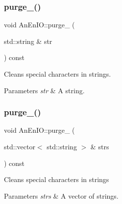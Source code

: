 \subsubsection{\texorpdfstring{purge\+\_\+()}{purge\_()}\hspace{0.1cm}{\footnotesize\ttfamily [1/2]}}
{\footnotesize\ttfamily void An\+En\+I\+O\+::purge\+\_\+ (\begin{DoxyParamCaption}\item[{std\+::string \&}]{str }\end{DoxyParamCaption}) const\hspace{0.3cm}{\ttfamily [protected]}}

Cleans special characters in strings.


\begin{DoxyParams}{Parameters}
{\em str} & A string. \\
\hline
\end{DoxyParams}
\mbox{\label{class_an_en_i_o_a7be5ab5c8c42fc9a04e4deeb0059a54d}} 
\subsubsection{\texorpdfstring{purge\+\_\+()}{purge\_()}\hspace{0.1cm}{\footnotesize\ttfamily [2/2]}}
{\footnotesize\ttfamily void An\+En\+I\+O\+::purge\+\_\+ (\begin{DoxyParamCaption}\item[{std\+::vector$<$ std\+::string $>$ \&}]{strs }\end{DoxyParamCaption}) const\hspace{0.3cm}{\ttfamily [protected]}}

Cleans special characters in strings


\begin{DoxyParams}{Parameters}
{\em strs} & A vector of strings. \\
\hline
\end{DoxyParams}
\mbox{\label{class_an_en_i_o_ae9cf0a8cde2b742992295ccc2bed17ef}} 
